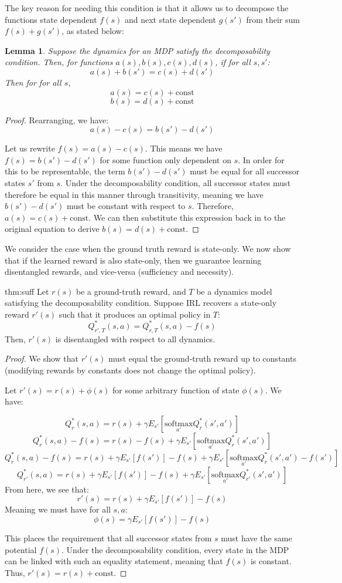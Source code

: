 \documentclass{article} \usepackage{iclr2018_conference,times}
\newtheorem{lemma}{Lemma}[section]
\newcommand{\lse}[1]{\underset{#1}{\textrm{softmax}}}
\newcommand{\const}{\textrm{const}}
\begin{document}
The key reason for needing this condition is that it allows us to decompose the functions state dependent $f(s)$ and next state dependent $g(s')$ from their sum $f(s) + g(s')$, as stated below:

\begin{lemma}
\label{lem:chaining}
Suppose the dynamics for an MDP satisfy the decomposability condition. Then, for functions $a(s),b(s),c(s),d(s)$, if for all $s,s'$:
\[
a(s) + b(s') = c(s) + d(s')
\]
Then for for all $s$,
\[a(s) = c(s) + \const \]
\[b(s) = d(s) + \const \]
\end{lemma}
\begin{proof}
Rearranging, we have:
\[a(s)-c(s) = b(s')-d(s')\]

Let us rewrite $f(s)=a(s)-c(s)$. This means we have $f(s) = b(s')-d(s')$ for some function only dependent on $s$. In order for this to be representable, the term $b(s')-d(s')$ must be equal for all successor states $s'$ from $s$. Under the decomposability condition, all successor states must therefore be equal in this manner through transitivity, meaning we have $b(s') - d(s')$ must be constant with respect to $s$. Therefore, $a(s) = c(s) + \const$. We can then substitute this expression back in to the original equation to derive $b(s) = d(s) + \const$.
\end{proof}

We consider the case when the ground truth reward is state-only. We now show that if the learned reward is also state-only, then we guarantee learning disentangled rewards, and vice-versa (sufficiency and necessity).
\begin{reptheorem}{thm:suff}
Let $r(s)$ be a ground-truth reward, and $T$ be a dynamics model satisfying the decomposability condition. Suppose IRL recovers a state-only reward $r'(s)$ such that it produces an optimal policy in $T$:
\[Q^*_{r', T}(s,a) = Q^*_{r, T}(s,a) - f(s)\]
Then, $r'(s)$ is disentangled with respect to all dynamics.
\end{reptheorem}
\begin{proof}
We show that $r'(s)$ must equal the ground-truth reward up to constants (modifying rewards by constants does not change the optimal policy). 

Let $r'(s) = r(s) + \phi(s)$ for some arbitrary function of state $\phi(s)$. We have:

\[Q^*_r(s,a) = r(s) + \gamma E_{s'}[\lse{a'} Q^*_r(s',a')] \]
\[Q^*_r(s,a) -f(s) = r(s) - f(s) + \gamma E_{s'}[\lse{a'} Q^*_r(s',a')] \]
\[Q^*_r(s,a) -f(s) = r(s) +\gamma E_{s'}[f(s')] - f(s) + \gamma E_{s'}[\lse{a'} Q^*_r(s',a') - f(s')] \]
\[Q^*_{r'}(s,a) = r(s) +\gamma E_{s'}[f(s')] - f(s) + \gamma E_{s'}[\lse{a'} Q^*_{r'}(s',a')] \]
From here, we see that:
\[r'(s) = r(s) +\gamma E_{s'}[f(s')] - f(s)\]
Meaning we must have for all $s,a$:
\[\phi(s) = \gamma E_{s'}[f(s')] - f(s)\]

This places the requirement that all successor states from $s$ must have the same potential $f(s)$. Under the decomposability condition, every state in the MDP can be linked with such an equality statement, meaning that $f(s)$ is constant. Thus, $r'(s) = r(s) + \const$.
\end{proof}
\end{document}
